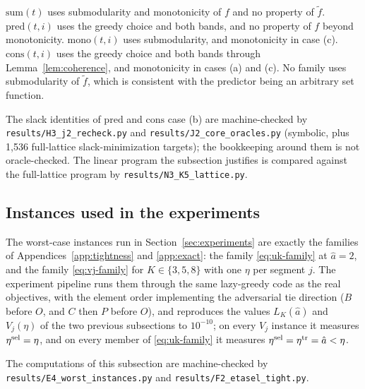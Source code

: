 \begin{remark}\label{rem:app-census}
$\mathrm{sum}(t)$ uses submodularity and monotonicity of $f$ and no property of
$\tilde f$.  $\mathrm{pred}(t,i)$ uses the greedy choice and both bands, and no
property of $f$ beyond monotonicity.  $\mathrm{mono}(t,i)$ uses submodularity,
and monotonicity in case (c).  $\mathrm{cons}(t,i)$ uses the greedy choice and
both bands through Lemma~\ref{lem:coherence}, and monotonicity in cases (a) and
(c).  No family uses submodularity of $\tilde f$, which is consistent with the
predictor being an arbitrary set function.
\end{remark}

The slack identities of $\mathrm{pred}$ and $\mathrm{cons}$ case (b) are
machine-checked by \texttt{results/H3\_j2\_recheck.py} and
\texttt{results/J2\_core\_oracles.py} (symbolic, plus 1{,}536 full-lattice
slack-minimization targets); the bookkeeping around them is not
oracle-checked.  The linear program the subsection justifies is compared
against the full-lattice program by \texttt{results/N3\_K5\_lattice.py}.

\subsection{Instances used in the experiments}\label{app:instances}
The worst-case instances run in Section~\ref{sec:experiments} are exactly the
families of Appendices~\ref{app:tightness} and \ref{app:exact}: the family
\eqref{eq:uk-family} at $\hat a=2$, and the family \eqref{eq:vj-family} for
$K\in\{3,5,8\}$ with one $\eta$ per segment $j$.  The experiment pipeline runs
them through the same lazy-greedy code as the real objectives, with the element
order implementing the adversarial tie direction ($B$ before $O$, and $C$ then
$P$ before $O$), and reproduces the values $L_K(\hat a)$ and $V_j(\eta)$ of the
two previous subsections to $10^{-10}$; on every $V_j$ instance it measures
$\eta^{\mathrm{sel}}=\eta$, and on every member of \eqref{eq:uk-family} it measures
$\eta^{\mathrm{sel}}=\eta^{\mathrm{tr}}=\hat a<\eta$.

The computations of this subsection are machine-checked by
\texttt{results/E4\_worst\_instances.py} and
\texttt{results/F2\_etasel\_tight.py}.
